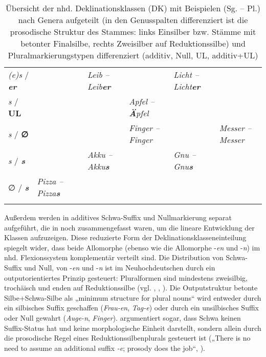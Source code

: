 \begin{table}
\begin{tabularx}{\textwidth}{QQQQQQQ}
\tablevspace
\textit{(e)s} / \textbf{\textit{er}} &  & \textit{Leib -- Leib}\textbf{\textit{er}} &  & {\textit{Licht -- Licht}\textbf{\textit{er}}} & \\
\tablevspace
\textit{s} / \textbf{UL} &  &  & \textit{Apfel --} \textbf{\textit{Ä}}\textit{pfel} & \\
\tablevspace
\textit{s} / \textbf{∅} &  &  & \textit{Finger -- Finger} &  & \textit{Messer -- Messer}\\
\midrule
\textit{s} / \textbf{\textit{s}} &  & \textit{Akku -- Akku}\textbf{\textit{s}} &  & {\textit{Gnu -- Gnu}\textbf{\textit{s}}} & \\
\tablevspace
∅ / \textbf{\textit{s}} & {\textit{Pizza -- Pizza}\textbf{\textit{s}}} &  &  & \\
\lspbottomrule
\end{tabularx}
\caption{Übersicht der nhd. Deklinationsklassen (DK) mit Beispielen (Sg. -- Pl.) nach Genera aufgeteilt (in den Genusspalten differenziert ist die prosodische Struktur des Stammes: links Einsilber bzw. Stämme mit betonter Finalsilbe, rechts Zweisilber auf Reduktionssilbe) und Pluralmarkierungstypen differenziert (additiv, Null, UL, additiv+UL)}
\label{tab:11}
\end{table}

Außerdem werden in 	 additives Schwa-Suffix und Nullmarkierung separat aufgeführt, die in  noch zusammengefasst waren, um die lineare Entwicklung der Klassen aufzuzeigen. Diese reduzierte Form der Deklinationsklasseneinteilung spiegelt wider, dass beide Allomorphe (ebenso wie die Allomorphe -\textit{en} und -\textit{n}) im nhd. Flexionssystem komplementär verteilt sind. Die Distribution von Schwa-Suffix und Null, von -\textit{en} und -\textit{n} ist im Neuhochdeutschen durch ein outputorientiertes Prinzip gesteuert: Pluralformen sind mindestens zweisilbig, trochäisch und enden auf Reduktionssilbe (vgl. \citealt[71]{Bittner1994}, \citealt[600--601]{DammelEtAl2010}, \citealt[479--480]{Neef2000}). Die Outputstruktur betonte Silbe+Schwa-Silbe als „minimum structure for plural nouns“ \citep[62]{Wiese1996} wird entweder durch ein silbisches Suffix geschaffen (\textit{Frau-en}, \textit{Tag-e}) oder durch ein unsilbisches Suffix oder Null gewahrt (\textit{Auge-n}, \textit{Finger}). \citet{Wiese2009} argumentiert sogar, dass Schwa keinen Suffix-Status hat und keine morphologische Einheit darstellt, sondern allein durch die prosodische Regel eines Reduktionssilbenplurals gesteuert ist („There is no need to assume an additional suffix \textit{{}-e}; prosody does the job“, \citealt[144]{Wiese2009}).

